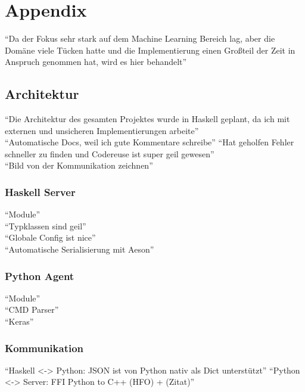 %
%
\chapter{Appendix}
``Da der Fokus sehr stark auf dem Machine Learning Bereich lag, aber die Domäne viele Tücken hatte und die Implementierung einen Großteil der Zeit in Anspruch genommen hat, wird es hier behandelt''

\section{Architektur}
    ``Die Architektur des gesamten Projektes wurde in Haskell geplant, da ich mit externen und unsicheren Implementierungen arbeite''\\
    ``Automatische Docs, weil ich gute Kommentare schreibe''
    ``Hat geholfen Fehler schneller zu finden und Codereuse ist super geil gewesen'' \\
    ``Bild von der Kommunikation zeichnen''
    \subsection{Haskell Server}
        ``Module'' \\
        ``Typklassen sind geil'' \\ 
        ``Globale Config ist nice'' \\
        ``Automatische Serialisierung mit Aeson''
    \subsection{Python Agent}
        ``Module''     \\
        ``CMD Parser'' \\
        ``Keras''
    \subsection{Kommunikation}
        ``Haskell <-> Python: JSON ist von Python nativ als Dict unterstützt''
        ``Python <-> Server: FFI Python to C++ (HFO) + (Zitat)''
